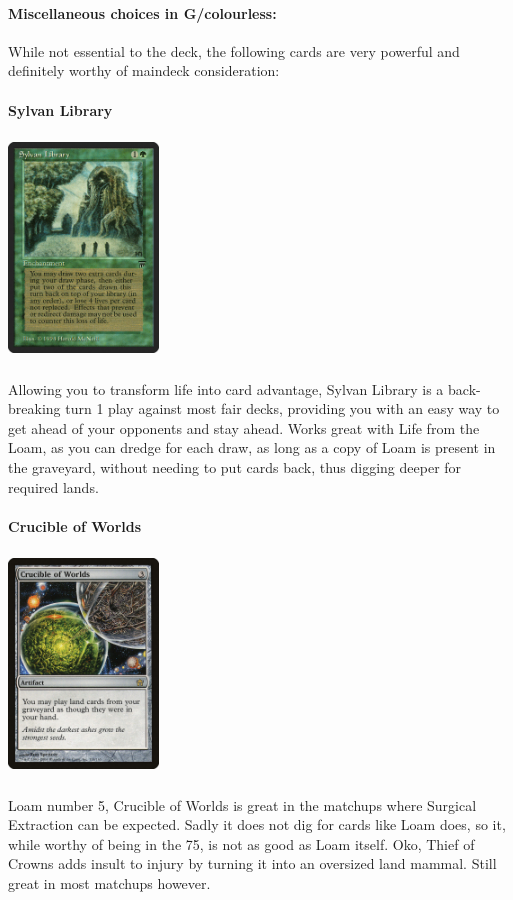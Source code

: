 \documentclass{report}
\begin{document}
\paragraph{Miscellaneous choices in G/colourless:\\}
While not essential to the deck, the following cards are very powerful and definitely worthy of maindeck consideration:\\\\
\textbf{Sylvan Library}
\begin{center}
\includegraphics [width = 4cm, height = 6cm] {sylvan-library}
\end{center}
Allowing you to transform life into card advantage, Sylvan Library is a back-breaking turn 1 play against most fair decks, providing you with an easy way to get ahead of your opponents and stay ahead. Works great with Life from the Loam, as you can dredge for each draw, as long as a copy of Loam is present in the graveyard, without needing to put cards back, thus digging deeper for required lands.\\\\
\textbf{Crucible of Worlds\\}
\begin{center}
\includegraphics [width = 4cm, height = 6cm] {crucible-of-worlds}
\end{center}
Loam number 5, Crucible of Worlds is great in the matchups where Surgical Extraction can be expected. Sadly it does not dig for cards like Loam does, so it, while worthy of being in the 75, is not as good as Loam itself. Oko, Thief of Crowns adds insult to injury by turning it into an oversized land mammal. Still great in most matchups however.\\\\
\end{document}
